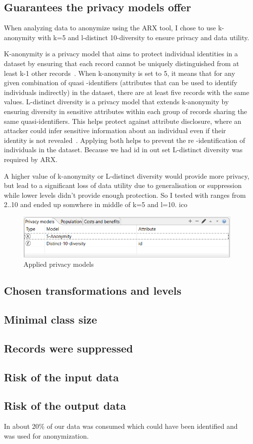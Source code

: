 \subsection{Guarantees the privacy models offer}

When analyzing data to anonymize using the ARX tool, I chose to use k-anonymity with k=5 and l-distinct 10-diversity to ensure privacy
and data utility.

K-anonymity is a privacy model that aims to protect individual identities in a dataset by ensuring that each record cannot be uniquely
distinguished from at least k-1 other records~\cite[]{sweeney2002k}. When k-anonymity is set to 5, it means that for any given
combination of quasi
-identifiers (attributes that can be used to identify individuals indirectly) in the dataset, there are at least five records with the same
values. L-distinct diversity is a privacy model that extends k-anonymity by ensuring diversity in sensitive attributes within each group
of records sharing the same quasi-identifiers. This helps protect against attribute disclosure, where an attacker could infer sensitive
information about an individual even if their identity is not revealed~\cite[]{sweeney2002k}. Applying both helps to prevent the re
-identification of individuals in the dataset. Because we had id in out set L-distinct diversity was required by ARX.

A higher value of k-anonymity or L-distinct diversity would provide more privacy, but lead to a significant loss of data utility due to generalisation or suppression
while
lower levels didn't provide enough protection. So I tested with ranges from 2..10 and ended up somwhere in middle of k=5 and l=10. \ac{ico}

\begin{figure}[ht]
  \centering
  \includegraphics[width=\textwidth]{assets/anon_level}
  \caption{Applied privacy models}
  \label{fig:my_label}
\end{figure}

\subsection{Chosen transformations and levels}

\subsection{Minimal class size}

\subsection{Records were suppressed}

\subsection{Risk of the input data}

\subsection{Risk of the output data}

In about 20\% of our data was consumed which could have been identified and was used for anonymization.
